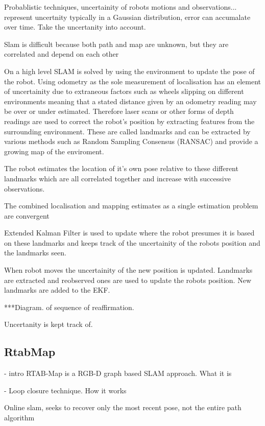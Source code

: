 \documentclass{mproj}
\begin{document}
Probablistic techniques, uncertainity of robots motions and observations... represent uncertnity typically in a Gaussian distribution, error can accumalate over time. Take the uncertanity into account.

Slam is difficult because both path and map are unknown, but they are correlated and depend on each other





On a high level SLAM is solved by using the environment to update the pose of the robot.  Using odometry as the sole measurement of localisation has an element of uncertainity due to extraneous factors such as wheels slipping on different environments meaning that a stated distance given by an odometry reading may be over or under estimated. Therefore laser scans or other forms of depth readings are used to correct the robot's position by extracting features from the surrounding environment. These are called landmarks and can be extracted by various methods such as Random Sampling Consensus (RANSAC) and provide a growing map of the enviroment. 


The robot estimates the location of it's own pose relative to these different landmarks which are all correlated together and increase with successive observations. \cite{Hugh1988}
  
The combined localisation and mapping estimates as a single estimation problem are convergent  
  
  Extended Kalman Filter is used to update where the robot presumes it is based on these landmarks and keeps track of the uncertainity of the robots position and the landmarks seen.
  
  When robot moves the uncertainity of the new position is updated.
  Landmarks are extracted and reobserved ones are used to update the robots position. New landmarks are added to the EKF. 
  
  ***Diagram. of sequence of reaffirmation.


Uncertanity is kept track of.



\subsection{RtabMap}

- intro RTAB-Map is a RGB-D graph based SLAM approach. What it is

- Loop closure technique. How it works

Online slam, seeks to recover only the most recent pose, not the entire path algorithm
\end{document}
